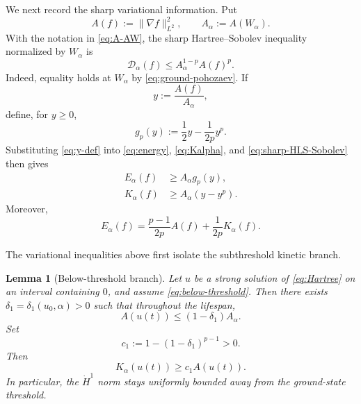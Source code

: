 \documentclass[preprint,12pt]{elsarticle}
\numberwithin{equation}{section}
\newtheorem{lemma}[theorem]{Lemma}
\theoremstyle{remark}
\newcommand{\Dcal}{\mathcal D_{\alpha}}
\newcommand{\Ecal}{E_{\alpha}}
\newcommand{\Kcal}{K_{\alpha}}
\begin{document}
We next record the sharp variational information. Put
\begin{equation}\label{eq:A-AW}
  A(f):=\|\nabla f\|_{L^2}^2,
  \qquad A_\alpha:=A(W_\alpha).
\end{equation}
With the notation in \eqref{eq:A-AW}, the sharp Hartree--Sobolev inequality normalized by $W_\alpha$ is
\begin{equation}\label{eq:sharp-HLS-Sobolev}
  \Dcal(f)\le A_\alpha^{1-p}A(f)^p.
\end{equation}
Indeed, equality holds at $W_\alpha$ by \eqref{eq:ground-pohozaev}. If
\begin{equation}\label{eq:y-def}
  y:=\frac{A(f)}{A_\alpha},
\end{equation}
define, for $y\ge0$,
\begin{equation*}
  g_p(y):=\frac12y-\frac1{2p}y^p.
\end{equation*}
Substituting \eqref{eq:y-def} into \eqref{eq:energy}, \eqref{eq:Kalpha}, and \eqref{eq:sharp-HLS-Sobolev} then gives
\begin{align}
  \Ecal(f)&\ge A_\alpha g_p(y),
  \label{eq:energy-lower-gp}\\
  \Kcal(f)&\ge A_\alpha(y-y^p).
  \label{eq:K-lower-y-Hartree}
\end{align}
Moreover,
\begin{equation}\label{eq:E-A-K}
  \Ecal(f)=\frac{p-1}{2p}A(f)+\frac1{2p}\Kcal(f).
\end{equation}

The variational inequalities above first isolate the subthreshold kinetic branch.

\begin{lemma}[Below-threshold branch]\label{lem:below-threshold-branch}
Let $u$ be a strong solution of \eqref{eq:Hartree} on an interval containing $0$, and assume \eqref{eq:below-threshold}. Then there exists $\delta_1=\delta_1(u_0,\alpha)>0$ such that throughout the lifespan,
\begin{equation}\label{eq:uniform-gradient-gap}
  A(u(t))\le(1-\delta_1)A_\alpha.
\end{equation}
Set
\begin{equation*}
  c_1:=1-(1-\delta_1)^{p-1}>0.
\end{equation*}
Then
\begin{equation}\label{eq:K-gradient-coercive}
  \Kcal(u(t))\ge c_1A(u(t)).
\end{equation}
In particular, the $\dot H^1$ norm stays uniformly bounded away from the ground-state threshold.
\end{lemma}
\end{document}
